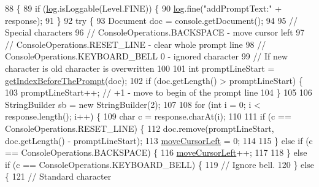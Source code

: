 \begin{DoxyCode}
88                                                                            \{
89     \textcolor{keywordflow}{if} (\hyperlink{classgov_1_1nasa_1_1jpf_1_1inspector_1_1frontends_1_1jpfshell_1_1gui_1_1_text_component_feeder_abd9a7fdd560d87f20caa912ed849ef72}{log}.isLoggable(Level.FINE)) \{
90       \hyperlink{classgov_1_1nasa_1_1jpf_1_1inspector_1_1frontends_1_1jpfshell_1_1gui_1_1_text_component_feeder_abd9a7fdd560d87f20caa912ed849ef72}{log}.fine(\textcolor{stringliteral}{"addPromptText:"} + response);
91     \}
92     \textcolor{keywordflow}{try} \{
93       Document doc = console.getDocument();
94 
95       \textcolor{comment}{// Special characters}
96       \textcolor{comment}{// ConsoleOperations.BACKSPACE - move cursor left}
97       \textcolor{comment}{// ConsoleOperations.RESET\_LINE - clear whole prompt line}
98       \textcolor{comment}{// ConsoleOperations.KEYBOARD\_BELL 0 - ignored character}
99       \textcolor{comment}{// If new character is old character is overwritten}
100 
101       \textcolor{keywordtype}{int} promptLineStart = \hyperlink{classgov_1_1nasa_1_1jpf_1_1inspector_1_1frontends_1_1jpfshell_1_1gui_1_1_text_component_feeder_a122cf261ba3298a3166351cb1b14fb05}{getIndexBeforeThePrompt}(doc);
102       \textcolor{keywordflow}{if} (doc.getLength() > promptLineStart) \{
103         promptLineStart++; \textcolor{comment}{// +1 - move to begin of the prompt line}
104       \}
105 
106       StringBuilder sb = \textcolor{keyword}{new} StringBuilder(2);
107 
108       \textcolor{keywordflow}{for} (\textcolor{keywordtype}{int} i = 0; i < response.length(); i++) \{
109         \textcolor{keywordtype}{char} c = response.charAt(i);
110 
111         \textcolor{keywordflow}{if} (c == ConsoleOperations.RESET\_LINE) \{
112           doc.remove(promptLineStart, doc.getLength() - promptLineStart);
113           \hyperlink{classgov_1_1nasa_1_1jpf_1_1inspector_1_1frontends_1_1jpfshell_1_1gui_1_1_text_component_feeder_ae2835ec22871ca52247fb80fbdfd95c0}{moveCursorLeft} = 0;
114 
115         \} \textcolor{keywordflow}{else} \textcolor{keywordflow}{if} (c == ConsoleOperations.BACKSPACE) \{
116           \hyperlink{classgov_1_1nasa_1_1jpf_1_1inspector_1_1frontends_1_1jpfshell_1_1gui_1_1_text_component_feeder_ae2835ec22871ca52247fb80fbdfd95c0}{moveCursorLeft}++;
117 
118         \} \textcolor{keywordflow}{else} \textcolor{keywordflow}{if} (c == ConsoleOperations.KEYBOARD\_BELL) \{
119           \textcolor{comment}{// Ignore bell.}
120         \} \textcolor{keywordflow}{else} \{
121           \textcolor{comment}{// Standard character}

\end{DoxyCode}
